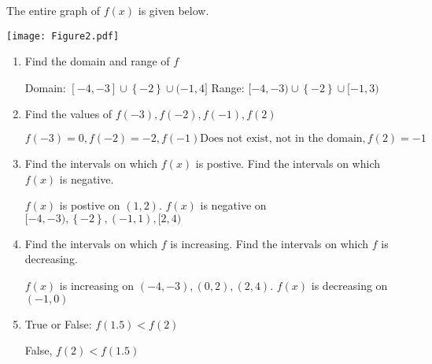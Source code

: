 \documentclass[nooutcomes, noinstructornotes]{ximera}
\begin{document}
\begin{problem}
The entire graph of $f(x)$ is given below.

	\begin{image}
	\texttt{[image: Figure2.pdf]}
	\end{image}

\begin{enumerate}	
	\item  Find the domain and range of $f$
		\begin{freeResponse}
			Domain: $[-4,-3]\cup\left\{-2\right\}\cup(-1,4]$
			Range: $[-4,-3)\cup\left\{-2\right\}\cup[-1,3)$
		\end{freeResponse}	

	\item  Find the values of $f(-3),f(-2), f(-1),f(2)$
		\begin{freeResponse}
		$f(-3)=0, f(-2)=-2, f(-1) \text{Does not exist, not in the domain}, f(2)=-1$
		\end{freeResponse}	

	\item  Find the intervals on which $f(x)$ is postive.  Find the intervals on which $f(x)$ is negative.
		\begin{freeResponse}
		 $f(x)$ is postive on $(1,2)$. $f(x)$ is negative on $[-4,-3),\left\{-2\right\},(-1,1),[2,4)$
		\end{freeResponse}
	
	\item Find the intervals on which $f$ is increasing.  Find the intervals on which $f$ is decreasing.
		\begin{freeResponse}
		$f(x)$ is increasing on $(-4,-3),(0,2),(2,4)$.  $f(x)$ is decreasing on $(-1,0)$
		\end{freeResponse}
	
	\item True or False: $f(1.5) < f(2)$
		\begin{freeResponse}
		False, $f(2) < f(1.5)$
		\end{freeResponse}	
	
	\end{enumerate}

	
\end{problem}

\begin{instructorNotes}

\end{instructorNotes}
\end{document}
